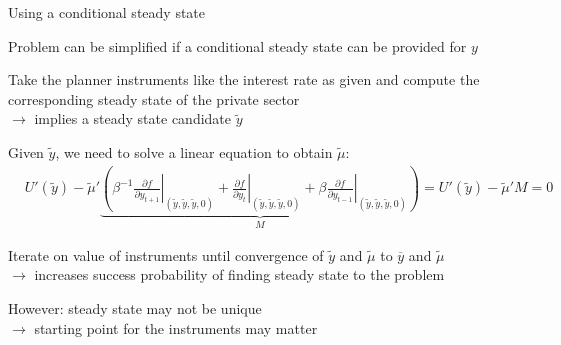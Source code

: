 \documentclass[handout,usepdftitle=false,xcolor=dvipsnames,aspectratio=169]{beamer}
\begin{document}
\begin{frame}{Using a conditional steady state}
  \begin{witemize}
    \item Problem can be simplified if a conditional steady state can be provided for $y$
    \item Take the planner instruments like the interest rate as given and compute the corresponding steady state of the private sector\\
    $\rightarrow$ implies a steady state candidate $\tilde y$
    \item Given $\tilde y$, we need to solve a linear equation to obtain $\tilde \mu$:
    \begin{align}
       & U' \left(\tilde{y} \right) - \tilde{\mu} ' \underbrace{\left( \beta^{-1} \left. \frac{\partial f}{\partial y_{t+1}} \right|_{\left( \tilde{y}, \tilde{y}, \tilde{y}, 0 \right)} + \left. \frac{\partial f}{\partial y_{t}} \right|_{\left( \tilde{y}, \tilde{y}, \tilde{y}, 0 \right)} + \beta \left. \frac{\partial f}{\partial y_{t-1}} \right|_{\left( \tilde{y}, \tilde{y}, \tilde{y}, 0 \right)} \right)}_M = U' \left(\tilde{y} \right) - \tilde{\mu} 'M= 0
    \end{align}
    \item Iterate on value of instruments until convergence of $\tilde y$ and $\tilde \mu$ to $\overline y$ and $\tilde \mu$\\
    $\rightarrow$ increases success probability of finding steady state to the problem
    \item However: steady state may not be unique\\
    $\rightarrow$ starting point for the instruments may matter
  \end{witemize}
\end{frame}
\end{document}
